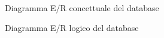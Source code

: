 \begin{figure}[ht]  
    \centering
    \caption{Diagramma E/R concettuale del database}
    \label{db_concettuale}
\end{figure}

\begin{figure}[ht]  
    \centering
    \caption{Diagramma E/R logico del database}
    \label{db_logico}
\end{figure}



